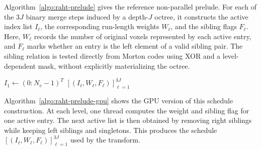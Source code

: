 Algorithm~\ref{algo:raht-prelude} gives the reference non-parallel prelude. For each of the $3J$ binary merge steps induced by a depth-$J$ octree, it constructs the active index list $I_\ell$, the corresponding run-length weights $W_\ell$, and the sibling flags $F_\ell$. Here, $W_\ell$ records the number of original voxels represented by each active entry, and $F_\ell$ marks whether an entry is the left element of a valid sibling pair. The sibling relation is tested directly from Morton codes using XOR and a level-dependent mask, without explicitly materializing the octree.

\begin{algorithm}[t!]
  \caption{RAHT Prelude on GPU}
  \label{algo:raht-prelude-gpu}
\SetAlgoLined
\DontPrintSemicolon
{}


$I_1 \gets (0{:}N_v{-}1)^{T}$\;
\Return $[(I_\ell, W_\ell, F_\ell)]_{\ell=1}^{3J}$\;
\end{algorithm}

Algorithm~\ref{algo:raht-prelude-gpu} shows the GPU version of this schedule construction. At each level, one thread computes the weight and sibling flag for one active entry. The next active list is then obtained by removing right siblings while keeping left siblings and singletons. This produces the schedule $[(I_\ell, W_\ell, F_\ell)]_{\ell=1}^{3J}$ used by the transform.

